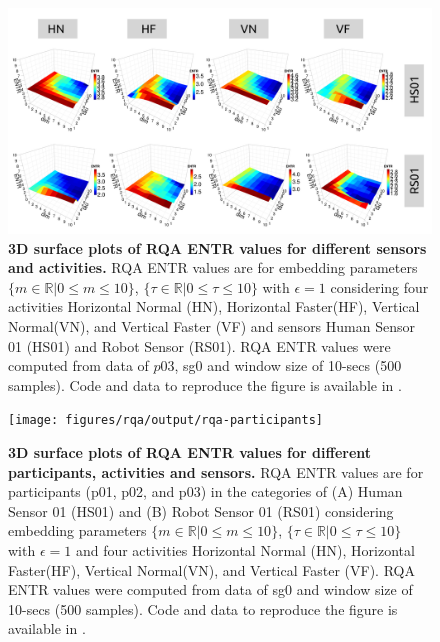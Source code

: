 \documentclass[fleqn,10pt]{wlscirep}
\begin{document}
\begin{figure}[ht]
\centering
\includegraphics[width=1.0\textwidth]{figures/rqa/output/rqa-sensors-activities}
    \caption{
	{\bf 3D surface plots of RQA ENTR values for different sensors and activities.}
	RQA ENTR values are for embedding parameters
	$ \{ m \in \mathbb{R} | 0 \le m \le 10  \}$,
	$ \{ \tau \in \mathbb{R} | 0 \le \tau \le 10  \}$
	with $\epsilon = 1 $ considering four activities 
	Horizontal Normal (HN), Horizontal Faster(HF), Vertical Normal(VN), and 
	Vertical Faster (VF) and sensors Human Sensor 01 (HS01) and 
	Robot Sensor (RS01).
	RQA ENTR values were computed from data of $p03$, sg0 and 
	window size of 10-secs (500 samples).
	Code and data to reproduce the figure is available in \cite{srep2021}.
       }
\label{fig:3dRQAENTR_sensoractivities}
\end{figure}

\begin{figure}[ht]
\centering
\texttt{[image: figures/rqa/output/rqa-participants]}
    \caption{
	{\bf 3D surface plots of RQA ENTR values for different participants, activities and sensors.}
	RQA ENTR values are for participants (p01, p02, and p03) 
	in the categories of 
	(A) Human Sensor 01 (HS01) and 
	(B) Robot Sensor 01 (RS01)
	considering embedding parameters
	$ \{ m \in \mathbb{R} | 0 \le m \le 10  \}$,
	$ \{ \tau \in \mathbb{R} | 0 \le \tau \le 10  \}$
	with $\epsilon = 1$ and four activities 
	Horizontal Normal (HN), Horizontal Faster(HF), Vertical Normal(VN), and 
	Vertical Faster (VF).
	RQA ENTR values were computed from data of sg0 and window size of 10-secs (500 samples).
	Code and data to reproduce the figure is available in \cite{srep2021}.
       }
\label{fig:3dRQAENTR_participantsactivities}
\end{figure}
\end{document}
